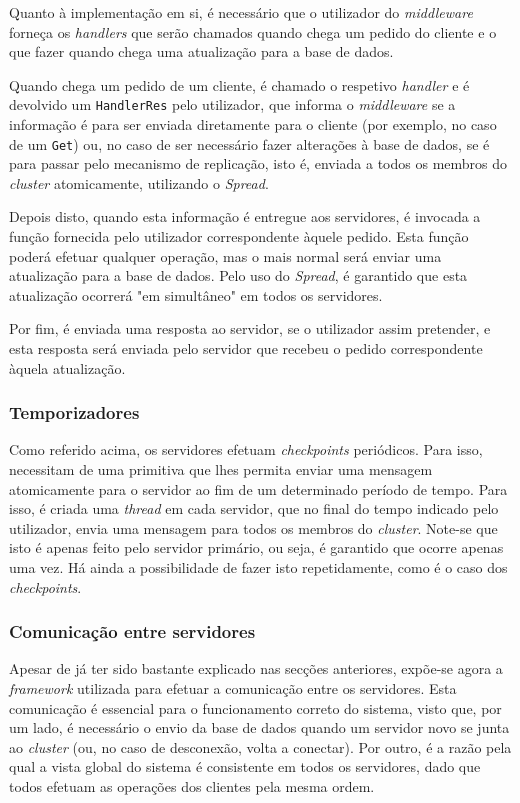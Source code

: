 \documentclass[a4paper]{report}
\begin{document}
{				Quanto à implementação em si, é necessário que o utilizador do \textit{middleware} forneça os \textit{handlers} que serão chamados quando chega um pedido do cliente e o que fazer quando chega uma atualização para a base de dados. 
				
				Quando chega um pedido de um cliente, é chamado o respetivo \textit{handler} e é devolvido um \texttt{HandlerRes} pelo utilizador, que informa o \textit{middleware} se a informação é para ser enviada diretamente para o cliente (por exemplo, no caso de um \texttt{Get}) ou, no caso de ser necessário fazer alterações à base de dados, se é para passar pelo mecanismo de replicação, isto é, enviada a todos os membros do \textit{cluster} atomicamente, utilizando o \textit{Spread}.
				
				Depois disto, quando esta informação é entregue aos servidores, é invocada a função fornecida pelo utilizador correspondente àquele pedido. Esta função poderá efetuar qualquer operação, mas o mais normal será enviar uma atualização para a base de dados. Pelo uso do \textit{Spread}, é garantido que esta atualização ocorrerá "em simultâneo" em todos os servidores.
				
				Por fim, é enviada uma resposta ao servidor, se o utilizador assim pretender, e esta resposta será enviada pelo servidor que recebeu o pedido correspondente àquela atualização.

			\subsubsection{Temporizadores} \label{sssec:Timers}
				Como referido acima, os servidores efetuam \textit{checkpoints} periódicos. Para isso, necessitam de uma primitiva que lhes permita enviar uma mensagem atomicamente para o servidor ao fim de um determinado período de tempo. Para isso, é criada uma \textit{thread} em cada servidor, que no final do tempo indicado pelo utilizador, envia uma mensagem para todos os membros do \textit{cluster}. Note-se que isto é apenas feito pelo servidor primário, ou seja, é garantido que ocorre apenas uma vez. Há ainda a possibilidade de fazer isto repetidamente, como é o caso dos \textit{checkpoints}.

			\subsubsection{Comunicação entre servidores} \label{sssec:ServerCommunication}
				Apesar de já ter sido bastante explicado nas secções anteriores, expõe-se agora a \textit{framework} utilizada para efetuar a comunicação entre os servidores. Esta comunicação é essencial para o funcionamento correto do sistema, visto que, por um lado, é necessário o envio da base de dados quando um servidor novo se junta ao \textit{cluster} (ou, no caso de desconexão, volta a conectar). Por outro, é a razão pela qual a vista global do sistema é consistente em todos os servidores, dado que todos efetuam as operações dos clientes pela mesma ordem.
				
}
\end{document}
